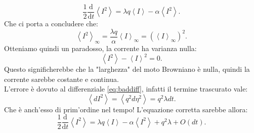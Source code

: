 \[
    \frac{1}{2}\frac{\text{d} }{\text{d} t} \left<I^2\right>= \lambda q\left<I\right>-\alpha\left<I^2\right>
.\] 
Che ci porta a concludere che:
\[
    \left<I^2\right>_{\infty} = \frac{\lambda q}{\alpha}\left<I\right>_{\infty} = \left(\left<I\right>_{\infty}\right)^2
.\] 
Otteniamo quindi un paradosso, la corrente ha varianza nulla:
\[
  \left<I^2\right>-\left<I\right>^2 = 0  
.\] 
Questo significherebbe che la "larghezza" del moto Browniano è nulla, quindi la corrente sarebbe costante e continua.\\
L'errore è dovuto al differenziale \ref{eq:baddiff}, infatti il termine trascurato vale:
\[
    \left<dI^2\right> = \left<q^2d\eta^2\right> = q^2\lambda dt
.\] 
Che è anch'esso di prim'ordine nel tempo! L'equazione corretta sarebbe allora:
\[
    \frac{1}{2}\frac{\text{d} }{\text{d} t} \left<I^2\right>= \lambda q\left<I\right>-\alpha\left<I^2\right> + q^2\lambda + O(dt)
.\]
\newpage
